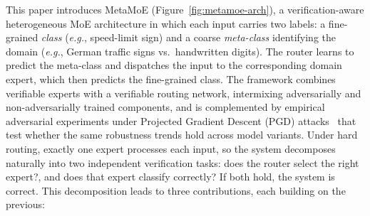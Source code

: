 \documentclass[runningheads]{llncs}
\begin{document}
This paper introduces \textsf{MetaMoE} (Figure~\ref{fig:metamoe-arch}), a verification-aware heterogeneous MoE architecture in which each input carries two labels: a fine-grained \emph{class} (\emph{e.g.}, speed-limit sign) and a coarse \emph{meta-class} identifying the domain (\emph{e.g.}, German traffic signs vs.\ handwritten digits). The router learns to predict the meta-class and dispatches the input to the corresponding domain expert, which then predicts the fine-grained class. The framework combines verifiable experts with a verifiable routing network, intermixing adversarially and non-adversarially trained components, and is complemented by empirical adversarial experiments under Projected Gradient Descent (PGD) attacks~\cite{madry2018} that test whether the same robustness trends hold across model variants. Under hard routing, exactly one expert processes each input, so the system decomposes naturally into two independent verification tasks: does the router select the right expert?, and does that expert classify correctly? If both hold, the system is correct. This decomposition leads to three contributions, each building on the previous:
\end{document}
